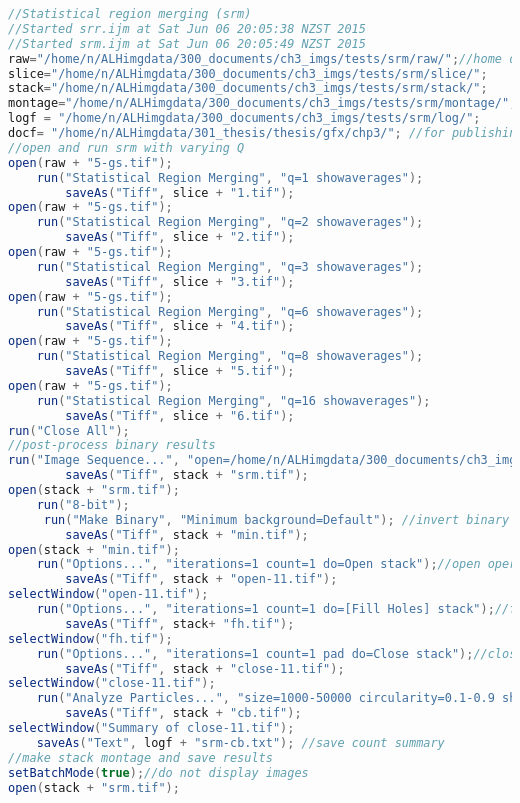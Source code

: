 \begin{lstlisting}[language=java, caption=Segmentation by region merging., label=cd:segment-srm]
//Statistical region merging (srm)
//Started srr.ijm at Sat Jun 06 20:05:38 NZST 2015
//Started srm.ijm at Sat Jun 06 20:05:49 NZST 2015
raw="/home/n/ALHimgdata/300_documents/ch3_imgs/tests/srm/raw/";//home dir 
slice="/home/n/ALHimgdata/300_documents/ch3_imgs/tests/srm/slice/"; 
stack="/home/n/ALHimgdata/300_documents/ch3_imgs/tests/srm/stack/"; 
montage="/home/n/ALHimgdata/300_documents/ch3_imgs/tests/srm/montage/"; 
logf = "/home/n/ALHimgdata/300_documents/ch3_imgs/tests/srm/log/"; 
docf= "/home/n/ALHimgdata/301_thesis/thesis/gfx/chp3/"; //for publishing images
//open and run srm with varying Q
open(raw + "5-gs.tif");
	run("Statistical Region Merging", "q=1 showaverages");
		saveAs("Tiff", slice + "1.tif");
open(raw + "5-gs.tif");
	run("Statistical Region Merging", "q=2 showaverages");
		saveAs("Tiff", slice + "2.tif");
open(raw + "5-gs.tif");
	run("Statistical Region Merging", "q=3 showaverages");
		saveAs("Tiff", slice + "3.tif");
open(raw + "5-gs.tif");
	run("Statistical Region Merging", "q=6 showaverages");
		saveAs("Tiff", slice + "4.tif"); 
open(raw + "5-gs.tif");
	run("Statistical Region Merging", "q=8 showaverages");
		saveAs("Tiff", slice + "5.tif");
open(raw + "5-gs.tif");
	run("Statistical Region Merging", "q=16 showaverages");
		saveAs("Tiff", slice + "6.tif"); 
run("Close All");
//post-process binary results
run("Image Sequence...", "open=/home/n/ALHimgdata/300_documents/ch3_imgs/tests/srm/slice/1.tif sort");
		saveAs("Tiff", stack + "srm.tif");
open(stack + "srm.tif");
	run("8-bit"); 
	 run("Make Binary", "Minimum background=Default"); //invert binary 
    	saveAs("Tiff", stack + "min.tif");
open(stack + "min.tif");
	run("Options...", "iterations=1 count=1 do=Open stack");//open operator
		saveAs("Tiff", stack + "open-11.tif");
selectWindow("open-11.tif");
	run("Options...", "iterations=1 count=1 do=[Fill Holes] stack");//fill holes
		saveAs("Tiff", stack+ "fh.tif");
selectWindow("fh.tif");
	run("Options...", "iterations=1 count=1 pad do=Close stack");//close operator
		saveAs("Tiff", stack + "close-11.tif");
selectWindow("close-11.tif");
	run("Analyze Particles...", "size=1000-50000 circularity=0.1-0.9 show=Outlines display clear summarize in_situ stack"); //particle count
		saveAs("Tiff", stack + "cb.tif");
selectWindow("Summary of close-11.tif"); 
	saveAs("Text", logf + "srm-cb.txt"); //save count summary
//make stack montage and save results
setBatchMode(true);//do not display images
open(stack + "srm.tif");

\end{lstlisting}
